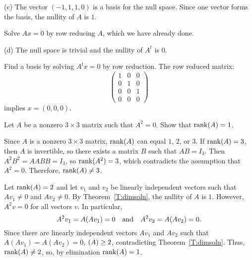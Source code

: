 \documentclass{ximera}
\begin{document}
\begin{exercise}
\begin{solution}
(c) \ans The vector $(-1,1,1,0)$ is a basis for the null space.  Since one
vector forms the basis, the nullity of $A$ is $1$.  

\soln Solve $Ax = 0$ by row reducing $A$, which we have already done.

(d) \ans The null space is trivial and the nullity of $A^t$ is $0$.

\soln Find a basis by solving $A^tx = 0$ by row reduction.  The row
reduced matrix:
\[
\left(\begin{array}{rrr} 1 & 0 & 0 \\ 0 & 1 & 0 \\ 0 & 0 & 1
\\ 0 & 0 & 0 \end{array}\right)
\]
implies $x = (0,0,0)$.


\end{solution}
\end{exercise}

\begin{exercise} \label{c5.8.4}
Let $A$ be a nonzero $3\times 3$ matrix such that $A^2=0$.  Show that
${\rm rank}(A)=1$.

\begin{solution}

Since $A$ is a nonzero $3 \times 3$ matrix, ${\rm rank}(A)$ can equal $1$,
$2$, or $3$.  If ${\rm rank}(A) = 3$, then $A$ is invertible, so there
exists a matrix $B$ such that $AB = I_3$.  Then $A^2B^2 = AABB = I_3$,
so ${\rm rank}(A^2) = 3$, which contradicts the assumption that $A^2 = 0$.
Therefore, ${\rm rank}(A) \neq 3$.

\para Let ${\rm rank}(A) = 2$ and let $v_1$ and $v_2$ be linearly independent
vectors such that $Av_1 \neq 0$ and $Av_2 \neq 0$.  By
Theorem~\ref{T:dimsoln}, the nullity of $A$ is $1$.  However,
$A^2v = 0$ for all vectors $v$.  In particular,
\[
A^2v_1 = A(Av_1) = 0 \quad\mbox{and}\quad A^2v_2 = A(Av_2) = 0.
\]
Since there are linearly independent vectors $Av_1$ and $Av_2$ such
that $A(Av_1) = A(Av_2) = 0$, $\null(A) \geq 2$, contradicting
Theorem~\ref{T:dimsoln}.  Thus, ${\rm rank}(A) \neq 2$, so, by elimination
${\rm rank}(A) = 1$.

\end{solution}
\end{exercise}
\end{document}
